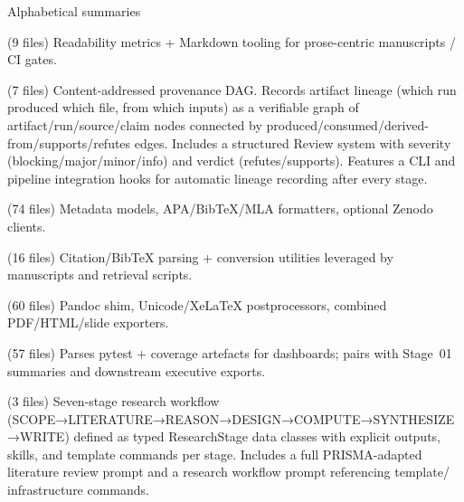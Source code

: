 \documentclass[
  ignorenonframetext,
]{beamer}
\begin{document}
\begin{frame}{Alphabetical summaries}
\begin{block}{ (9 files)}
\protect{}\label{infrastructure.prose-9-files}
Readability metrics + Markdown tooling for prose-centric manuscripts /
CI gates.
\end{block}

\begin{block}{ (7 files)}
\protect{}\label{infrastructure.provenance-7-files}
Content-addressed provenance DAG. Records artifact lineage (which run
produced which file, from which inputs) as a verifiable graph of
artifact/run/source/claim nodes connected by
produced/consumed/derived-from/supports/refutes edges. Includes a
structured Review system with severity (blocking/major/minor/info) and
verdict (refutes/supports). Features a CLI and pipeline integration
hooks for automatic lineage recording after every stage.
\end{block}

\begin{block}{ (74 files)}
\protect{}\label{infrastructure.publishing-74-files}
Metadata models, APA/BibTeX/MLA formatters, optional Zenodo clients.
\end{block}

\begin{block}{ (16 files)}
\protect{}\label{infrastructure.reference-16-files}
Citation/BibTeX parsing + conversion utilities leveraged by manuscripts
and retrieval scripts.
\end{block}

\begin{block}{ (60 files)}
\protect{}\label{infrastructure.rendering-60-files}
Pandoc shim, Unicode/XeLaTeX postprocessors, combined PDF/HTML/slide
exporters.
\end{block}

\begin{block}{ (57 files)}
\protect{}\label{infrastructure.reporting-57-files}
Parses pytest + coverage artefacts for dashboards; pairs with Stage~01
summaries and downstream executive exports.
\end{block}

\begin{block}{ (3 files)}
\protect{}\label{infrastructure.research-3-files}
Seven-stage research workflow
(SCOPE→LITERATURE→REASON→DESIGN→COMPUTE→SYNTHESIZE→WRITE) defined as
typed ResearchStage data classes with explicit outputs, skills, and
template commands per stage. Includes a full PRISMA-adapted literature
review prompt and a research workflow prompt referencing template/
infrastructure commands.
\end{block}


\end{frame}
\end{document}
